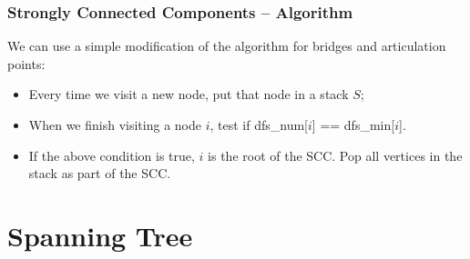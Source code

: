 \begin{frame}
  \frametitle{Strongly Connected Components -- Algorithm}

  We can use a simple modification of the algorithm for bridges and
  articulation points:

  \begin{itemize}
    \item Every time we visit a new node, put that node in a stack $S$;
    \item When we finish visiting a node $i$, test if dfs\_num[$i$] == dfs\_min[$i$].
    \item If the above condition is true, $i$ is the root of the
      SCC. Pop all vertices in the stack as part of the SCC.
  \end{itemize}
\end{frame}


\section{Spanning Tree}
